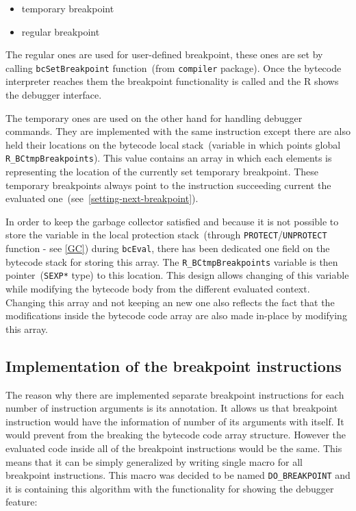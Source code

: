 \documentclass[thesis=M,english]{FITthesis}[2018/10/20]
\newcommand{\code}[1]{\texttt{#1}}
\begin{document}
\begin{itemize}
	\item temporary breakpoint
	\item regular breakpoint
\end{itemize}

The regular ones are used for user-defined breakpoint, these ones are set by calling \code{bcSetBreakpoint} function~(from \code{compiler} package). Once the bytecode interpreter reaches them the breakpoint functionality is called and the R shows the debugger interface.

The temporary ones are used on the other hand for handling debugger commands. They are implemented with the same instruction except there are also held their locations on the bytecode local stack~(variable in which points global \code{R{\_}BCtmpBreakpoints}). This value contains an array in which each elements is representing the location of the currently set temporary breakpoint. These temporary breakpoints always point to the instruction succeeding current the evaluated one~(see~\ref{setting-next-breakpoint}).

In order to keep the garbage collector satisfied and because it is not possible to store the variable in the local protection stack~(through \code{PROTECT}/\code{UNPROTECT} function - see \ref{GC}) during \code{bcEval}, there has been dedicated one field on the bytecode stack for storing this array. The \code{R{\_}BCtmpBreakpoints} variable is then pointer~(\code{SEXP*} type) to this location. This design allows changing of this variable while modifying the bytecode body from the different evaluated context. Changing this array and not keeping an new one also reflects the fact that the modifications inside the bytecode code array are also made in-place by modifying this array.

\subsection{Implementation of the breakpoint instructions}\label{implementation-of-breakpoint-instruction}

The reason why there are implemented separate breakpoint instructions for each number of instruction arguments is its annotation. It allows us that breakpoint instruction would have the information of number of its arguments with itself. It would prevent from the breaking the bytecode code array structure. However the evaluated code inside all of the breakpoint instructions would be the same. This means that it can be simply generalized by writing single macro for all breakpoint instructions. This macro was decided to be named \code{DO{\_}BREAKPOINT} and it is containing this algorithm with the functionality for showing the debugger feature:
\end{document}
